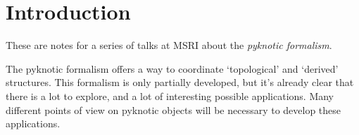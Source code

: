 
\section*{Introduction}

These are notes for a series of talks at MSRI about the \emph{pyknotic formalism}.

The pyknotic formalism offers a way to coordinate `topological' and `derived' structures.
This formalism is only partially developed, but it’s already clear that there is a lot to explore, and a lot of interesting possible applications.
Many different points of view on pyknotic objects will be necessary to develop these applications.